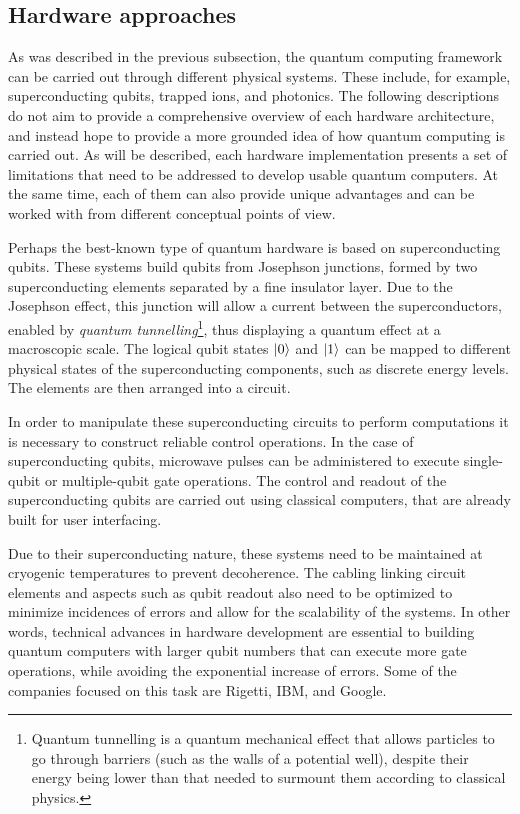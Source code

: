 \subsection{Hardware approaches}

As was described in the previous subsection, the quantum computing framework can be carried out through different physical systems. These include, for example, superconducting qubits, trapped ions, and photonics. The following descriptions do not aim to provide a comprehensive overview of each hardware architecture, and instead hope to provide a more grounded idea of how quantum computing is carried out. As will be described, each hardware implementation presents a set of limitations that need to be addressed to develop usable quantum computers. At the same time, each of them can also provide unique advantages and can be worked with from different conceptual points of view. 

Perhaps the best-known type of quantum hardware is based on superconducting qubits. These systems build qubits from Josephson junctions, formed by two superconducting elements separated by a fine insulator layer. Due to the Josephson effect, this junction will allow a current between the superconductors, enabled by \textit{quantum tunnelling}\footnote{Quantum tunnelling is a quantum mechanical effect that allows particles to go through barriers (such as the walls of a potential well), despite their energy being lower than that needed to surmount them according to classical physics.}, thus displaying a quantum effect at a macroscopic scale. The logical qubit states $\ket{0}$ and $\ket{1}$ can be mapped to different physical states of the superconducting components, such as discrete energy levels. The elements are then arranged into a circuit. 

In order to manipulate these superconducting circuits to perform computations it is necessary to construct reliable control operations. In the case of superconducting qubits, microwave pulses can be administered to execute single-qubit or multiple-qubit gate operations. The control and readout of the superconducting qubits are carried out using classical computers, that are already built for user interfacing.

Due to their superconducting nature, these systems need to be maintained at cryogenic temperatures to prevent decoherence. The cabling linking circuit elements and aspects such as qubit readout also need to be optimized to minimize incidences of errors and allow for the scalability of the systems. In other words, technical advances in hardware development are essential to building quantum computers with larger qubit numbers that can execute more gate operations, while avoiding the exponential increase of errors. Some of the companies focused on this task are Rigetti, IBM, and Google.

